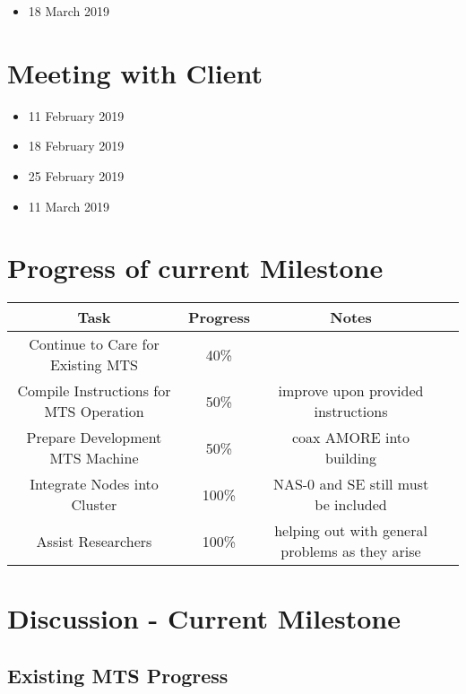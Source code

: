 \documentclass[12pt]{article}
\begin{document}
\begin{itemize}
	\item 18 March 2019
\end{itemize}
\section{Meeting with Client}

\begin{itemize}
	\item 11 February 2019
	\item 18 February 2019
	\item 25 February 2019
	\item 11 March 2019
\end{itemize}

\section{Progress of current Milestone}

\begin{adjustwidth}{-2.5cm}{}
  \begin{center}
      \begin{tabular}{|c|c|c|c|}
    	\hline
    	Task & Progress & Notes\\
    	\hline
    	Continue to Care for Existing MTS & 40\% & \\
    	Compile Instructions for MTS Operation & 50\% & improve upon provided
                                                        instructions \\
    	Prepare Development MTS Machine & 50\% & coax AMORE into building \\
    	Integrate Nodes into Cluster & 100\% & NAS-0 and SE still must be
                                               included \\
    	Assist Researchers & 100\% & helping out with general problems as they
                                     arise \\
    	\hline
    \end{tabular}
  \end{center}
\end{adjustwidth}



\section{Discussion - Current Milestone}

\subsection{Existing MTS Progress}
\end{document}
